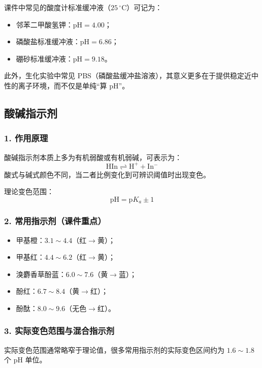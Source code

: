 \documentclass[12pt,a4paper]{article}
\numberwithin{equation}{section}
\begin{document}
课件中常见的酸度计标准缓冲液（$25\,^{\circ}\mathrm{C}$）可记为：
\begin{itemize}
    \item 邻苯二甲酸氢钾：$\mathrm{pH}=4.00$；
    \item 磷酸盐标准缓冲液：$\mathrm{pH}=6.86$；
    \item 硼砂标准缓冲液：$\mathrm{pH}=9.18$。
\end{itemize}

此外，生化实验中常见 PBS（磷酸盐缓冲盐溶液），其意义更多在于提供稳定近中性的离子环境，而不仅是单纯“算 pH”。

\subsection{酸碱指示剂}

\subsubsection{1. 作用原理}
酸碱指示剂本质上多为有机弱酸或有机弱碱，可表示为：
\begin{equation}
\mathrm{HIn}\rightleftharpoons \mathrm{H^+}+\mathrm{In^-}
\end{equation}
酸式与碱式颜色不同，当二者比例变化到可辨识阈值时出现变色。

理论变色范围：
\begin{equation}
\mathrm{pH}=\mathrm{p}K_a\pm 1
\end{equation}

\subsubsection{2. 常用指示剂（课件重点）}
\begin{itemize}
    \item 甲基橙：$3.1\sim 4.4$（红$\rightarrow$黄）；
    \item 甲基红：$4.4\sim 6.2$（红$\rightarrow$黄）；
    \item 溴麝香草酚蓝：$6.0\sim 7.6$（黄$\rightarrow$蓝）；
    \item 酚红：$6.7\sim 8.4$（黄$\rightarrow$红）；
    \item 酚酞：$8.0\sim 9.6$（无色$\rightarrow$红）。
\end{itemize}

\subsubsection{3. 实际变色范围与混合指示剂}
实际变色范围通常略窄于理论值，很多常用指示剂的实际变色区间约为
$1.6\sim 1.8$ 个 pH 单位。
\end{document}
